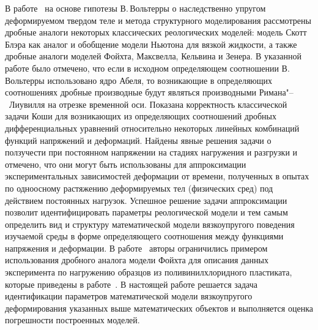 \documentclass[11pt,a4paper,twoside]{article}
\begin{document}





\date{20/VII/2009} %







\maketitle







В работе~\cite{OgoRadUng16} на основе гипотезы В.\,Вольтерры о наследственно упругом деформируемом твердом теле и метода структурного моделирования рассмотрены дробные аналоги некоторых классических реологических моделей: модель Скотт Блэра как аналог и обобщение модели Ньютона для вязкой жидкости, а также дробные аналоги моделей Фойхта, Максвелла, Кельвина и Зенера. В указанной работе было отмечено, что если в исходном определяющем соотношении В.\,Вольтерры использовано ядро Абеля, то возникающие в определяющих соотношениях дробные производные будут являться производными Римана"--~Лиувилля на отрезке временной оси. Показана корректность классической задачи Коши для возникающих из определяющих соотношений дробных дифференциальных уравнений относительно некоторых линейных комбинаций функций напряжений и деформаций. Найдены явные решения задачи о ползучести при постоянном напряжении на стадиях нагружения и разгрузки и отмечено, что они могут быть использованы для аппроксимации экспериментальных зависимостей деформации от времени, полученных в опытах по одноосному растяжению деформируемых тел (физических сред) под действием постоянных нагрузок. Успешное решение задачи аппроксимации позволит идентифицировать параметры реологической модели и тем самым определить вид и структуру математической модели вязкоупругого поведения изучаемой среды в форме определяющего соотношения между функциями напряжения и деформации. В работе~\cite{OgoRadUng16} авторы ограничились примером использования дробного аналога модели Фойхта для описания данных эксперимента по нагружению образцов из поливинилхлоридного пластиката, которые приведены в работе~\cite{RadchenkoGoludin}. В настоящей работе решается задача идентификации параметров математической модели вязкоупругого деформирования указанных выше  математических объектов и выполняется оценка погрешности построенных моделей. 
\end{document}

